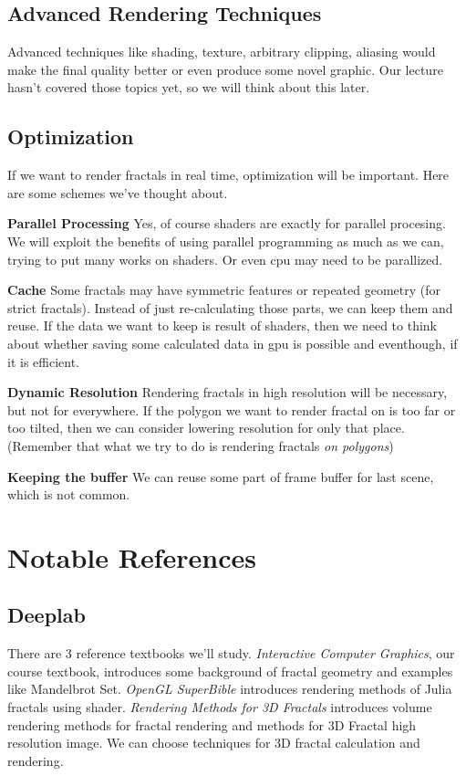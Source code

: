 \documentclass[a4paper]{article}
\begin{document}
\subsection{Advanced Rendering Techniques}
Advanced techniques like shading, texture, arbitrary clipping, aliasing would make the final quality better or even produce some novel graphic.
Our lecture hasn't covered those topics yet, so we will think about this later.

\subsection{Optimization}
If we want to render fractals in real time, optimization will be important.
Here are some schemes we've thought about.

\textbf{Parallel Processing}
Yes, of course shaders are exactly for parallel procesing.
We will exploit the benefits of using parallel programming as much as we can, trying to put many works on shaders.
Or even cpu may need to be parallized.

\textbf{Cache}
Some fractals may have symmetric features or repeated geometry (for strict fractals).
Instead of just re-calculating those parts, we can keep them and reuse.
If the data we want to keep is result of shaders, then we need to think about whether saving some calculated data in gpu is possible and eventhough, if it is efficient.

\textbf{Dynamic Resolution}
Rendering fractals in high resolution will be necessary, but not for everywhere.
If the polygon we want to render fractal on is too far or too tilted, then we can consider lowering resolution for only that place.
(Remember that what we try to do is rendering fractals \textit{on polygons})

\textbf{Keeping the buffer}
We can reuse some part of frame buffer for last scene, which is not common.


\section{Notable References}
\subsection{Deeplab}
There are 3 reference textbooks we'll study.
\textit{Interactive Computer Graphics}\cite{c1}, our course textbook, introduces some background of fractal geometry and examples like Mandelbrot Set.
\textit{OpenGL SuperBible}\cite{c2} introduces rendering methods of Julia fractals using shader.
\textit{Rendering Methods for 3D Fractals}\cite{c3} introduces volume rendering methods for fractal rendering and methods for 3D Fractal high resolution image. We can choose techniques for 3D fractal calculation and rendering.
\end{document}
